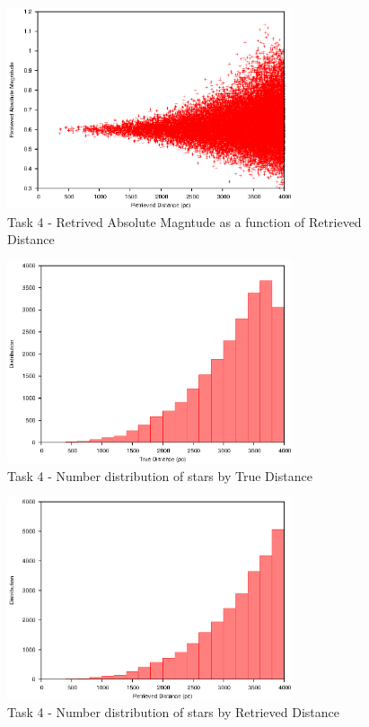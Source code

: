 \documentclass[a4paper,12pt]{article}
\begin{document}
\begin{figure}[H]
\centering
\includegraphics[width=0.75\textwidth]{./Task4/Graph1}
\caption{Task 4 - Retrived Absolute Magntude as a function of Retrieved Distance}
\label{fig:t4graph1}
\end{figure}

\begin{figure}[H]
\centering
\includegraphics[width=0.75\textwidth]{./Task4/Graph2}
\caption{Task 4 - Number distribution of stars by True Distance}
\label{fig:t4graph2}
\end{figure}

\begin{figure}[H]
\centering
\includegraphics[width=0.75\textwidth]{./Task4/Graph3}
\caption{Task 4 - Number distribution of stars by Retrieved Distance}
\label{fig:t4graph3}
\end{figure}
\end{document}
